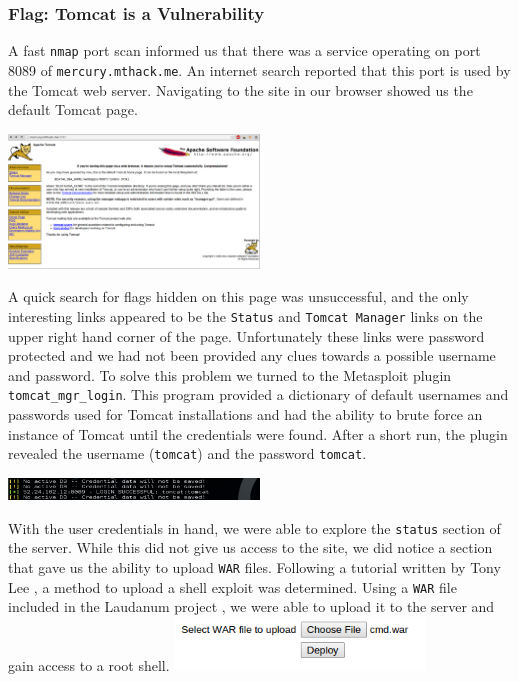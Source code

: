 \documentclass[10pt,a4paper,titlepage]{article}
\begin{document}
\subsubsection{Flag: Tomcat is a Vulnerability}
A fast \texttt{nmap} port scan informed us that there was a service operating on port 8089 of \texttt{mercury.mthack.me}. An internet search reported that this port is used by the Tomcat web server. Navigating to the site in our browser showed us the default Tomcat page.
\begin{center}
\includegraphics[width=0.5\textwidth]{mercury_flags/TomcatIsAVulnerability/tomcat}
\end{center}
A quick search for flags hidden on this page was unsuccessful, and the only interesting links appeared to be the \texttt{Status} and \texttt{Tomcat Manager} links on the upper right hand corner of the page. Unfortunately these links were password protected and we had not been provided any clues towards a possible username and password. To solve this problem we turned to the Metasploit plugin \texttt{tomcat\_mgr\_login}. This program provided a dictionary of default usernames and passwords used for Tomcat installations and had the ability to brute force an instance of Tomcat until the credentials were found. After a short run, the plugin revealed the username (\texttt{tomcat}) and the password \texttt{tomcat}.
\begin{center}
\includegraphics[width=0.5\textwidth]{mercury_flags/TomcatIsAVulnerability/found}
\end{center}
With the user credentials in hand, we were able to explore the \texttt{status} section of the server. While this did not give us access to the site, we did notice a section that gave us the ability to upload \texttt{WAR} files. Following a tutorial written by Tony Lee \cite{tomcat}, a method to upload a shell exploit was determined. Using a \texttt{WAR} file included in the Laudanum project \cite{Laudanum}, we were able to upload it to the server and gain access to a root shell.
\includegraphics[width=0.5\textwidth]{mercury_flags/TomcatIsAVulnerability/war}
\end{document}
